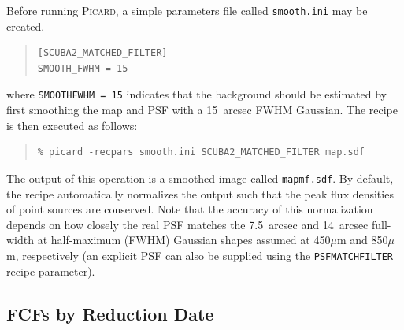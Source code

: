 \documentclass[twoside,11pt]{article}
\newenvironment{latexonly}{}{}
\newcommand{\xlabel}[1]{}
\renewcommand{\_}{\texttt{\symbol{95}}}
\newenvironment{fmpage}[1]{\begin{lrbox}{\fmbox}\begin{minipage}{#1}}{\end{minipage}\end{lrbox}\fbox{\usebox{\fmbox}}}
\newenvironment{myquote}{\begin{quote}\begin{small}}{\end{small}\end{quote}}
\newcommand{\param}[1]{\texttt{#1}}
\begin{document}
Before running \textsc{Picard}, a simple parameters file called \texttt{smooth.ini}
may be created.
\begin{latexonly}
\begin{center}
\begin{fmpage}{0.8\linewidth}
\vspace{0.2cm}
\begin{myquote}
\begin{verbatim}
[SCUBA2_MATCHED_FILTER]
SMOOTH_FWHM = 15
\end{verbatim}
\end{myquote}
\vspace{0.4cm}
\end{fmpage}
\end{center}
\end{latexonly}
%
where \texttt{SMOOTH\_FWHM~=~15} indicates that the background should
be estimated by first smoothing the map and PSF with a 15~arcsec FWHM
Gaussian. The recipe is then executed as follows:
%
\begin{myquote}
\begin{verbatim}
% picard -recpars smooth.ini SCUBA2_MATCHED_FILTER map.sdf
\end{verbatim}
\end{myquote}
%
The output of this operation is a smoothed image called
\texttt{map\_mf.sdf}. By default, the recipe automatically normalizes
the output such that the peak flux densities of point sources are
conserved. Note that the accuracy of this normalization depends on how
closely the real PSF matches the 7.5~arcsec and 14~arcsec full-width
at half-maximum (FWHM) Gaussian shapes assumed at 450$\mu$m and
850$\mu$m, respectively (an explicit PSF can also be supplied using
the \param{PSF\_MATCHFILTER} recipe parameter).



\newpage
\subsection{\xlabel{fcfsred}FCFs by Reduction Date}
\label{app:fcfs}
\end{document}
